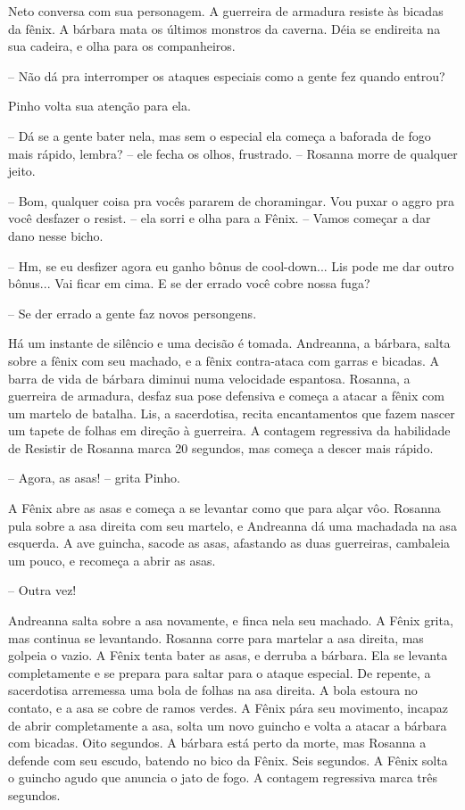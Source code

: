Neto conversa com sua personagem. A guerreira de armadura resiste às bicadas da fênix. A bárbara mata os últimos monstros da caverna.
Déia se endireita na sua cadeira, e olha para os companheiros.

-- Não dá pra interromper os ataques especiais como a gente fez quando entrou?

Pinho volta sua atenção para ela.

-- Dá se a gente bater nela, mas sem o especial ela começa a baforada de fogo mais rápido, lembra? -- ele fecha os olhos, frustrado. -- Rosanna morre de qualquer jeito.

-- Bom, qualquer coisa pra vocês pararem de choramingar. Vou puxar o aggro pra você desfazer o resist. -- ela sorri e olha para a Fênix. 
-- Vamos começar a dar dano nesse bicho.

-- Hm, se eu desfizer agora eu ganho bônus de cool-down... Lis pode me dar outro bônus... Vai ficar em cima. E se der errado você cobre nossa fuga?

-- Se der errado a gente faz novos persongens.

Há um instante de silêncio e uma decisão é tomada. Andreanna, a bárbara, salta sobre a fênix com seu machado, e a fênix contra-ataca com garras e bicadas.
A barra de vida de bárbara diminui numa velocidade espantosa.
Rosanna, a guerreira de armadura, desfaz sua pose defensiva e começa a atacar a fênix com um martelo de batalha. Lis, a sacerdotisa, recita encantamentos
que fazem nascer um tapete de folhas em direção à guerreira. A contagem regressiva da habilidade de Resistir de Rosanna marca 20 segundos, mas começa a descer mais rápido.

-- Agora, as asas! -- grita Pinho.

A Fênix abre as asas e começa a se levantar como que para alçar vôo. 
Rosanna pula sobre a asa direita com seu martelo, e Andreanna dá uma machadada na asa esquerda.
A ave guincha, sacode as asas, afastando as duas guerreiras, cambaleia um pouco, e recomeça a abrir as asas.

-- Outra vez!

Andreanna salta sobre a asa novamente, e finca nela seu machado. A Fênix grita, mas continua se levantando.
Rosanna corre para martelar a asa direita, mas golpeia o vazio.
A Fênix tenta bater as asas, e derruba a bárbara. Ela se levanta completamente e se prepara para saltar para o ataque especial.
De repente, a sacerdotisa arremessa uma bola de folhas na asa direita. A bola estoura no contato,
e a asa se cobre de ramos verdes. A Fênix pára seu movimento, incapaz de abrir completamente a asa, 
solta um novo guincho e volta a atacar a bárbara com bicadas. Oito segundos.
A bárbara está perto da morte, mas Rosanna a defende com seu escudo, batendo no bico da Fênix. Seis segundos.
A Fênix solta o guincho agudo que anuncia o jato de fogo. A contagem regressiva marca três segundos.

